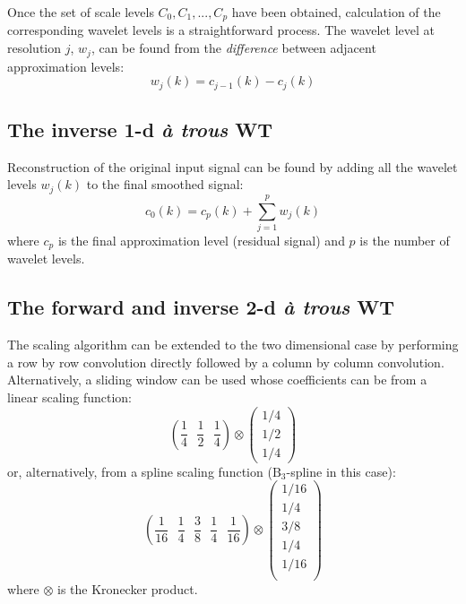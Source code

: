 \documentclass[12pt]{report}
\begin{document}
Once the set of scale levels $C_{0}, C_{1}, \mbox{...}, C_{p}$ have been obtained, calculation
of the corresponding wavelet levels is a straightforward process. 
The wavelet level at resolution $j$, 
$w_{j}$, can be
found from
the \emph{difference} between adjacent approximation levels:
\begin{equation}
        w_{j}(k)=c_{j-1}(k)-c_{j}(k)
\end{equation}

\subsection{The inverse 1-d {\em \`a trous} WT}
\label{sec:inv1dAT}
Reconstruction of the original input signal can be found by
adding all the wavelet levels $w_{j}(k)$ to the final smoothed signal:
\begin{equation}
	\label{reconEq}
        c_{0}(k)=c_{p}(k)+\sum_{j=1}^{p}w_{j}(k)
\end{equation}
where $c_{p}$ is the final approximation level (residual signal) and $p$ is the number of wavelet levels.

\subsection{The forward and inverse 2-d  {\em \`a trous} WT}
\label{sec:fwdinv2dAT}
The scaling algorithm can be extended to the two dimensional case by performing
a row by row convolution directly followed by a column by column convolution.
Alternatively, a sliding window can be used whose coefficients can be from a linear scaling function:
\begin{equation}
	\left( 	\frac{1}{4} \mbox{ } \frac{1}{2} \mbox{ } \frac{1}{4} \right) 
	\otimes 
	\left(	\begin{array}{c}
			1/4 \\
			1/2 \\
			1/4
		\end{array}
	\right)
	\label{linMask}
\end{equation}
or, alternatively, from a spline scaling function ($\mbox{B}_{3}$-spline in this case):
\begin{equation}
	\left(  \frac{1}{16} \mbox{ } \frac{1}{4} \mbox{ } \frac{3}{8} \mbox{ } \frac{1}{4} \mbox{ } \frac{1}{16} \right)
	\otimes
	\left(  \begin{array}{c}
			1/16 \\
			1/4  \\
			3/8  \\
			1/4  \\
			1/16 \\
		\end{array}
	\label{splineMask}
	\right)
\end{equation}
where $\otimes$ is the Kronecker product. 
\end{document}
